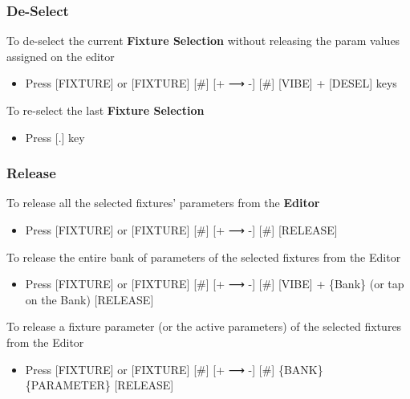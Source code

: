 \documentclass[
]{article}
\providecommand{\tightlist}{%
  \setlength{\itemsep}{0pt}\setlength{\parskip}{0pt}}
\begin{document}
\hypertarget{de-select}{%
\subsubsection{De-Select}\label{de-select}}

To de-select the current \textbf{Fixture Selection} without releasing the param values assigned on the editor

\begin{itemize}
\tightlist
\item
  Press {[}FIXTURE{]} or {[}FIXTURE{]} {[}\#{]} {[}+ ⟶ -{]} {[}\#{]} {[}VIBE{]} + {[}DESEL{]} keys
\end{itemize}

To re-select the last \textbf{Fixture Selection}

\begin{itemize}
\tightlist
\item
  Press {[}.{]} key
\end{itemize}

\hypertarget{release}{%
\subsubsection{Release}\label{release}}

To release all the selected fixtures' parameters from the \textbf{Editor}

\begin{itemize}
\tightlist
\item
  Press {[}FIXTURE{]} or {[}FIXTURE{]} {[}\#{]} {[}+ ⟶ -{]} {[}\#{]} {[}RELEASE{]}
\end{itemize}

To release the entire bank of parameters of the selected fixtures from the Editor

\begin{itemize}
\tightlist
\item
  Press {[}FIXTURE{]} or {[}FIXTURE{]} {[}\#{]} {[}+ ⟶ -{]} {[}\#{]} {[}VIBE{]} + \{Bank\} (or tap on the Bank) {[}RELEASE{]}
\end{itemize}

To release a fixture parameter (or the active parameters) of the selected fixtures from the Editor

\begin{itemize}
\tightlist
\item
  Press {[}FIXTURE{]} or {[}FIXTURE{]} {[}\#{]} {[}+ ⟶ -{]} {[}\#{]} \{BANK\} \{PARAMETER\} {[}RELEASE{]}
\end{itemize}
\end{document}

